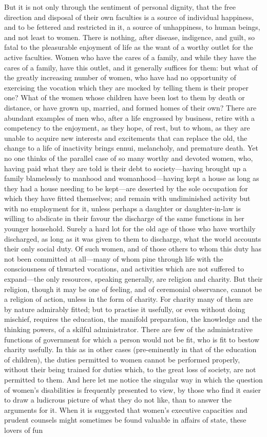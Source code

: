 \documentclass[12pt]{report}
\begin{document}
But it is not only through the sentiment of personal dignity, that the free direction and disposal of their own faculties is a source of individual happiness, and to be fettered and restricted in it, a source of unhappiness, to human beings, and not least to women. There is nothing, after disease, indigence, and guilt, so fatal to the pleasurable enjoyment of life as the want of a worthy outlet for the active faculties. Women who have the cares of a family, and while they have the cares of a family, have this outlet, and it generally suffices for them: but what of the greatly increasing number of women, who have had no opportunity of exercising the vocation which they are mocked by telling them is their proper one? What of the women whose children have been lost to them by death or distance, or have grown up, married, and formed homes of their own? There are abundant examples of men who, after a life engrossed by business, retire with a competency to the enjoyment, as they hope, of rest, but to whom, as they are unable to acquire new interests and excitements that can replace the old, the change to a life of inactivity brings ennui, melancholy, and premature death. Yet no one thinks of the parallel case of so many worthy and devoted women, who, having paid what they are told is their debt to society—having brought up a family blamelessly to manhood and womanhood—having kept a house as long as they had a house needing to be kept—are deserted by the sole occupation for which they have fitted themselves; and remain with undiminished activity but with no employment for it, unless perhaps a daughter or daughter-in-law is willing to abdicate in their favour the discharge of the same functions in her younger household. Surely a hard lot for the old age of those who have worthily discharged, as long as it was given to them to discharge, what the world accounts their only social duty. Of such women, and of those others to whom this duty has not been committed at all—many of whom pine through life with the consciousness of thwarted vocations, and activities which are not suffered to expand—the only resources, speaking generally, are religion and charity. But their religion, though it may be one of feeling, and of ceremonial observance, cannot be a religion of action, unless in the form of charity. For charity many of them are by nature admirably fitted; but to practise it usefully, or even without doing mischief, requires the education, the manifold preparation, the knowledge and the thinking powers, of a skilful administrator. There are few of the administrative functions of government for which a person would not be fit, who is fit to bestow charity usefully. In this as in other cases (pre-eminently in that of the education of children), the duties permitted to women cannot be performed properly, without their being trained for duties which, to the great loss of society, are not permitted to them. And here let me notice the singular way in which the question of women's disabilities is frequently presented to view, by those who find it easier to draw a ludicrous picture of what they do not like, than to answer the arguments for it. When it is suggested that women's executive capacities and prudent counsels might sometimes be found valuable in affairs of state, these lovers of fun 
\end{document}
